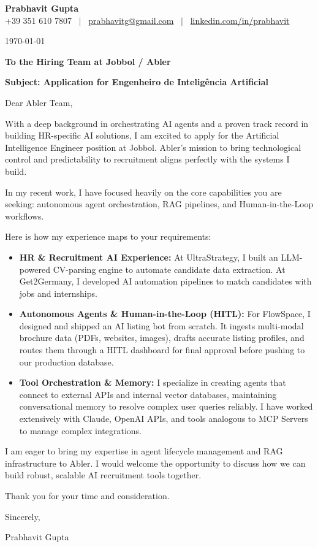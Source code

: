 \documentclass[a4paper,11pt]{article}
\begin{document}
\begin{center}
 {\Huge\bfseries Prabhavit Gupta}\\[3pt]
 +39 351 610 7807 ~$\vert$~ \href{mailto:prabhavitg@gmail.com}{prabhavitg@gmail.com} ~$\vert$~ \href{https://www.linkedin.com/in/prabhavit/}{linkedin.com/in/prabhavit}\\[10pt]
\end{center}

\vspace{1em}

\today

\textbf{To the Hiring Team at Jobbol / Abler}

\vspace{1em}

\textbf{Subject: Application for Engenheiro de Inteligência Artificial}

\vspace{1em}

Dear Abler Team,

With a deep background in orchestrating AI agents and a proven track record in building HR-specific AI solutions, I am excited to apply for the Artificial Intelligence Engineer position at Jobbol. Abler's mission to bring technological control and predictability to recruitment aligns perfectly with the systems I build.

In my recent work, I have focused heavily on the core capabilities you are seeking: autonomous agent orchestration, RAG pipelines, and Human-in-the-Loop workflows. 

Here is how my experience maps to your requirements:
\begin{itemize}
    \item \textbf{HR \& Recruitment AI Experience:} At UltraStrategy, I built an LLM-powered CV-parsing engine to automate candidate data extraction. At Get2Germany, I developed AI automation pipelines to match candidates with jobs and internships.
    \item \textbf{Autonomous Agents \& Human-in-the-Loop (HITL):} For FlowSpace, I designed and shipped an AI listing bot from scratch. It ingests multi-modal brochure data (PDFs, websites, images), drafts accurate listing profiles, and routes them through a HITL dashboard for final approval before pushing to our production database.
    \item \textbf{Tool Orchestration \& Memory:} I specialize in creating agents that connect to external APIs and internal vector databases, maintaining conversational memory to resolve complex user queries reliably. I have worked extensively with Claude, OpenAI APIs, and tools analogous to MCP Servers to manage complex integrations.
\end{itemize}

I am eager to bring my expertise in agent lifecycle management and RAG infrastructure to Abler. I would welcome the opportunity to discuss how we can build robust, scalable AI recruitment tools together.

Thank you for your time and consideration.

Sincerely,

Prabhavit Gupta
\end{document}
